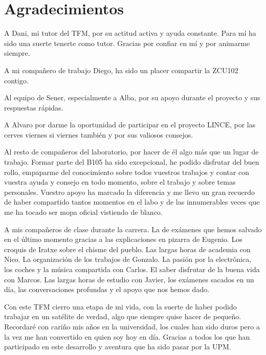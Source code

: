 \chapter{Agradecimientos}

A Dani, mi tutor del TFM, por su actitud activa y ayuda constante. Para mí ha sido una suerte
tenerte como tutor. Gracias por confiar en mí y por animarme siempre.

A mi compañero de trabajo Diego, ha sido un placer compartir la ZCU102 contigo.

Al equipo de Sener, especialmente a Alba, por su apoyo durante el proyecto y sus respuestas rápidas.

A Alvaro por darme la oportunidad de participar en el proyecto LINCE, por las cerves viernes si viernes también y por
sus valiosos consejos.

Al resto de compañeros del laboratorio, por hacer de él algo más que un lugar de
trabajo. Formar parte del B105 ha sido excepcional, he podido disfrutar del buen rollo,
empaparme del conocimiento sobre todos vuestros trabajos y contar con vuestra ayuda y consejo en todo momento, sobre el trabajo
y sobre temas personales. Vuestro apoyo ha marcado la diferencia y me llevo un gran recuerdo
de haber compartido tantos momentos en el labo y de las innumerables veces que me ha tocado
ser mopa oficial vistiendo de blanco.

A mis compañeros de clase durante la carrera. La de exámenes que hemos salvado en el último momento
gracias a las explicaciones en pizarra de Eugenio. Los croquis de Iratxe sobre el chisme del pueblo.
Las largas horas de academia con Nico. La organización de los trabajos de Gonzalo.
La pasión por la electrónica, los coches y la música compartida con Carlos. El saber disfrutar de la buena vida con Marcos.
Las largas horas de estudio con Javier, los exámenes sacados en un día, las conversaciones profundas
y el apoyo que nos hemos dado. 

Con este TFM cierro una etapa de mi vida, con la suerte de haber podido trabajar en un satélite de verdad,
algo que siempre quise hacer de pequeño. Recordaré con cariño mis años en la universidad, los cuales han 
sido duros pero a la vez me han convertido en quien soy hoy en día. Gracias a todos los que han participado
en este desarrollo y aventura que ha sido pasar por la UPM.